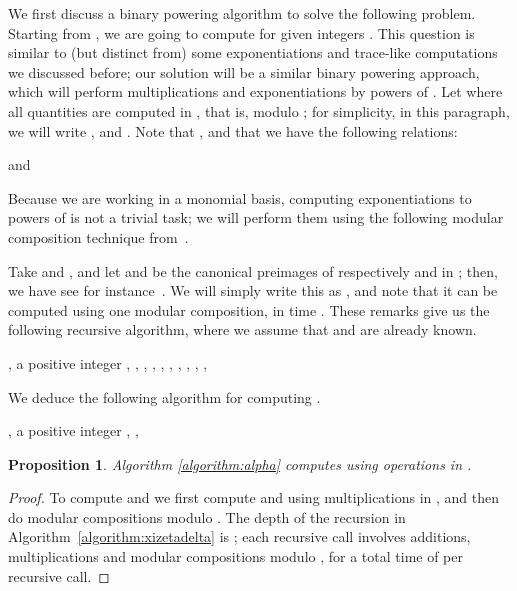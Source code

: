 \documentclass[12pt]{article}
\theoremstyle{plain}
\newtheorem{proposition}[theorem]{Proposition}
\theoremstyle{definition}
\newcommand{\refalgorithm}[1]{Algorithm \ref{#1}}
\newcounter{algorithm}
\begin{document}
We first discuss a binary powering algorithm to solve the following
problem. Starting from , we are going to compute
 for given integers . This question is similar to (but
distinct from) some exponentiations and trace-like computations we
discussed before; our solution will be a similar binary powering 
approach, which will perform  multiplications and
exponentiations by powers of . Let
 where all quantities are computed in , that is, modulo ;
for simplicity, in this paragraph, we will write , 
and . Note that , and that we
have the following relations:

and

Because we are working in a monomial basis, computing exponentiations
to powers of  is not a trivial task; we will perform them using the
following modular composition technique from~\cite{GaSh92}.

Take  and , and let  and  be the
canonical preimages of respectively  and  in ;
then, we have
 see for instance~\cite[Chapter
  14.7]{GaGe03}. We will simply write this as , and note
that it can be computed using one modular composition, in time
. These remarks give us the following recursive algorithm,
where we assume that  and  are already
known.

\begin{algorithm}
[XiZetaDelta]
\label{algorithm:xizetadelta}
\begin{algorithmic}[1]
\REQUIRE , a positive integer , , 
\ENSURE , , 
\IF {} 
\RETURN , , 
\ENDIF
\STATE 
\STATE  
\STATE 
\STATE 
\STATE 
{} 
\RETURN , , 
\ENDIF
\STATE 
\STATE 
\STATE 
\RETURN , , 
\end{algorithmic}
\end{algorithm}
We deduce the following algorithm for computing .

\begin{algorithm}
[Alpha]
\label{algorithm:alpha}
\begin{algorithmic}[1]
\REQUIRE , a positive integer 
\ENSURE 
\STATE 
\STATE 
\STATE , ,  
\RETURN 
\end{algorithmic}
\end{algorithm}

\begin{proposition}
  \refalgorithm{algorithm:alpha} computes  using
   operations in .
\end{proposition}
\begin{proof}
  To compute  and  we first compute  and
   using  multiplications in , and then
  do  modular compositions modulo . The depth of the
  recursion in Algorithm~\ref{algorithm:xizetadelta} is ;
  each recursive call involves  additions, multiplications and
  modular compositions modulo , for a total time of  per
  recursive call.
\end{proof}
\end{document}
